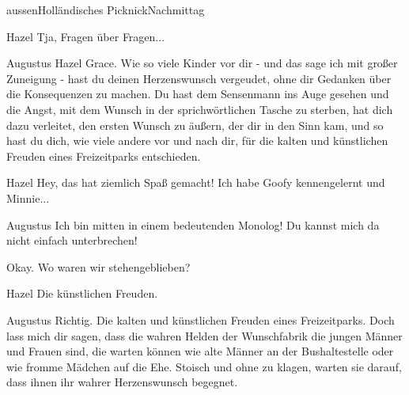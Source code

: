 \documentclass[12pt]{article}
\begin{document}
\begin{scene}{aussen}{Holländisches Picknick}{Nachmittag}
        \begin{dialog}{Hazel}
            Tja, Fragen über Fragen...
        \end{dialog}

        \begin{dialog}{Augustus}
            Hazel Grace.
            Wie so viele Kinder vor dir - und das sage ich mit großer Zuneigung - hast du deinen Herzenswunsch vergeudet, ohne dir Gedanken über die Konsequenzen zu machen.
            Du hast dem Sensenmann ins Auge gesehen und die Angst, mit dem Wunsch in der sprichwörtlichen Tasche zu sterben, hat dich dazu verleitet, den ersten Wunsch zu äußern, der dir in den Sinn kam, und so hast du dich, wie viele andere vor und nach dir, für die kalten und künstlichen Freuden eines Freizeitparks entschieden.
        \end{dialog}

        \begin{dialog}{Hazel}
            Hey, das hat ziemlich Spaß gemacht!
            Ich habe Goofy kennengelernt und Minnie...
        \end{dialog}

        \begin{dialog}{Augustus}
            Ich bin mitten in einem bedeutenden Monolog!
            Du kannst mich da nicht einfach unterbrechen!

            Okay.
            Wo waren wir stehengeblieben?
        \end{dialog}

        \begin{dialog}{Hazel}
            Die künstlichen Freuden.
        \end{dialog}


        \begin{dialog}{Augustus}
            Richtig.
            Die kalten und künstlichen Freuden eines Freizeitparks.
            Doch lass mich dir sagen, dass die wahren Helden der Wunschfabrik die jungen Männer und Frauen sind, die warten können wie alte Männer an der Bushaltestelle oder wie fromme Mädchen auf die Ehe.
            Stoisch und ohne zu klagen, warten sie darauf, dass ihnen ihr wahrer Herzenswunsch begegnet.
        \end{dialog}
    \end{scene}
\end{document}
